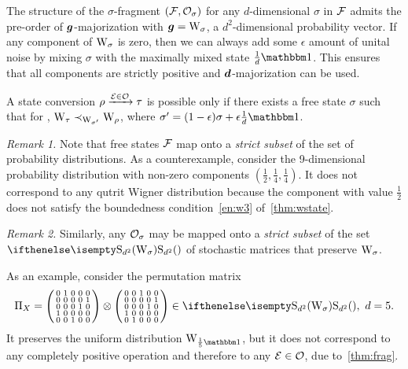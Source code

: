 The structure of the $\sigma$-fragment $(\mathcal{F}, \mathcal{O}_\sigma)$ for any $d$-dimensional $\sigma$ in $\mathcal{F}$ admits the pre-order of $\bm{g}$-majorization with $\bmg = \W{\sigma}$, a $d^2$-dimensional probability vector. 
If any component of $\W{\sigma}$ is zero, then we can always add some $\epsilon$ amount of unital noise by mixing $\sigma$ with the maximally mixed state $\frac{1}{d}\id$. 
This ensures that all components are strictly positive and $\bm{d}$-majorization can be used.

\begin{proposition}
    A state conversion $\rho \xrightarrow{\mathcal{E} \in \mathcal{O}} \tau$ is possible only if there exists a free state $\sigma$ such that for , $\W{\tau} \prec_{\W{\sigma'}} \W{\rho}$, where $\sigma' = (1-\epsilon)\sigma + \epsilon \frac{1}{d}\id$.
\end{proposition}

\emph{Remark 1.} Note that free states $\mathcal{F}$ map onto a \emph{strict subset} of the set of probability distributions.
As a counterexample, consider the 9-dimensional probability distribution with non-zero components $\left(\frac{1}{2}, \frac{1}{4}, \frac{1}{4} \right)$. 
It does not correspond to any qutrit Wigner distribution because the component with value $\frac{1}{2}$ does not satisfy the boundedness condition~\ref{en:w3} of~\cref{thm:wstate}.

\emph{Remark 2.} Similarly, any $\mathcal{O}_\sigma$ may be mapped onto a \emph{strict subset} of the set $\stochw$ of stochastic matrices that preserve $\W{\sigma}{}$.

As an example, consider the permutation matrix
\begin{equation}
    \Pi_X = \begin{psmallmatrix}
        0 & 1 & 0 & 0 & 0 \\
        0 & 0 & 0 & 0 & 1 \\
        0 & 0 & 0 & 1 & 0 \\
        1 & 0 & 0 & 0 & 0 \\
        0 & 0 & 1 & 0 & 0
    \end{psmallmatrix} \otimes \begin{psmallmatrix}
        0 & 0 & 1 & 0 & 0 \\
        0 & 0 & 0 & 0 & 1 \\
        0 & 0 & 0 & 1 & 0 \\
        1 & 0 & 0 & 0 & 0 \\
        0 & 1 & 0 & 0 & 0    
    \end{psmallmatrix} \in \stochw,\ d=5.
\end{equation}
It preserves the uniform distribution $\W{\frac{1}{5}\id}{}$, but it does not correspond to any completely positive operation and therefore to any $\mathcal{E} \in \mathcal{O}$, due to~\cref{thm:frag}.

